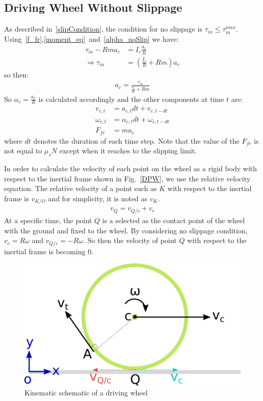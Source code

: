 \documentclass[letterpaper, 10pt, conference]{ieeeconf}
\begin{document}
\subsection{Driving Wheel Without Slippage} \label{DWNoSlip}
As described in~\eqref{slipCondition}, the condition for no slippage is $\tau_{in} \leqslant \tau_{in}^{max}$. Using~\eqref{f_fr},\eqref{moment_eq}~and~\eqref{alpha_noSlip} we have:
\begin{align*}
\tau_{in} - Rma_c &= I_c \frac{a_c}{R} \\
\Rightarrow \tau_{in} &= (\frac{I_c}{R} + Rm)a_c
\end{align*}
so then:
\begin{align}
a_c = \frac{\tau_{in}}{\frac{I_c}{R} + Rm}
\end{align}
So $\alpha_c = \frac{a_c}{R}$ is calculated accordingly and the other components at time $t$ are:
\begin{align}
v_{c,t} &= a_{c,t}dt + v_{c,t-dt} \label{linearVel}\\
\omega_{c,t} &= \alpha_{c,t}dt + \omega_{c,t-dt} \label{angularVel}\\
F_{fr} &= ma_c
\end{align}
where $dt$ denotes the duration of each time step. Note that the value of the $F_{fr}$ is not equal to $\mu_sN$ except when it reaches to the slipping limit.

In order to calculate the velocity of each point on the wheel as a rigid body with respect to the inertial frame shown in Fig.~\ref{DPW}, we use the relative velocity equation. The relative velocity of a point such as $K$ with respect to the inertial frame is $v_{K/O}$ and for simplicity, it is noted as $v_K$.
\begin{align}
v_Q = v_{Q/c} + v_c
\end{align}
At a specific time, the point $Q$ is a selected as the contact point of the wheel with the ground and fixed to the wheel. By considering no slippage condition, $v_c = R\omega$ and $v_{Q/c} = -R\omega$. So then the velocity of point $Q$ with respect to the inertial frame is becoming $0$.

\begin{figure}[!h] 
	\centering
	\includegraphics[width=0.85\columnwidth]{figs/Vel.pdf}
	\caption{Kinematic schematic of a driving wheel}
	\label{velFig}
\end{figure}
\end{document}
